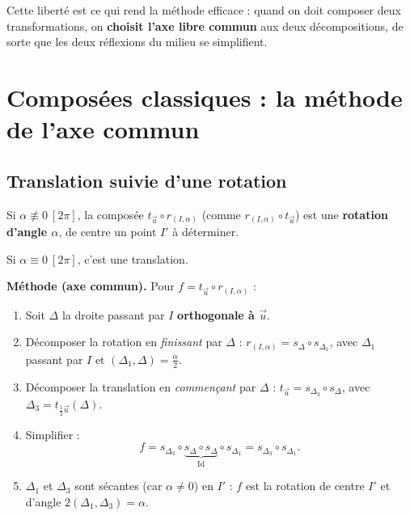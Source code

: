 \begin{astucebac}
	Cette liberté est ce qui rend la méthode efficace : quand on doit composer
	deux transformations, on \textbf{choisit l'axe libre commun} aux deux
	décompositions, de sorte que les deux réflexions du milieu se simplifient.
\end{astucebac}


\section{Composées classiques : la méthode de l'axe commun}

\subsection{Translation suivie d'une rotation}

\begin{theoreme}
	Si $\alpha\not\equiv 0\ [2\pi]$, la composée $t_{\vec u}\circ r_{(I,\alpha)}$
	(comme $r_{(I,\alpha)}\circ t_{\vec u}$) est une \textbf{rotation d'angle
	$\alpha$}, de centre un point $I'$ à déterminer.

	Si $\alpha\equiv 0\ [2\pi]$, c'est une translation.
\end{theoreme}

\textbf{Méthode (axe commun).} Pour $f=t_{\vec u}\circ r_{(I,\alpha)}$ :
\begin{enumerate}
	\item Soit $\Delta$ la droite passant par $I$ \textbf{orthogonale à $\vec u$}.
	\item Décomposer la rotation en \emph{finissant} par $\Delta$ :
	$r_{(I,\alpha)} = s_{\Delta}\circ s_{\Delta_1}$, avec $\Delta_1$ passant par
	$I$ et $(\Delta_1,\Delta)=\tfrac{\alpha}{2}$.
	\item Décomposer la translation en \emph{commençant} par $\Delta$ :
	$t_{\vec u} = s_{\Delta_3}\circ s_{\Delta}$, avec $\Delta_3 = t_{\frac12\vec u}(\Delta)$.
	\item Simplifier :
	$$
	f = s_{\Delta_3}\circ \underbrace{s_{\Delta}\circ s_{\Delta}}_{\mathrm{Id}}\circ s_{\Delta_1}
	  = s_{\Delta_3}\circ s_{\Delta_1}.
	$$
	\item $\Delta_1$ et $\Delta_3$ sont sécantes (car $\alpha\neq 0$) en $I'$ :
	$f$ est la rotation de centre $I'$ et d'angle $2(\Delta_1,\Delta_3)=\alpha$.
\end{enumerate}

